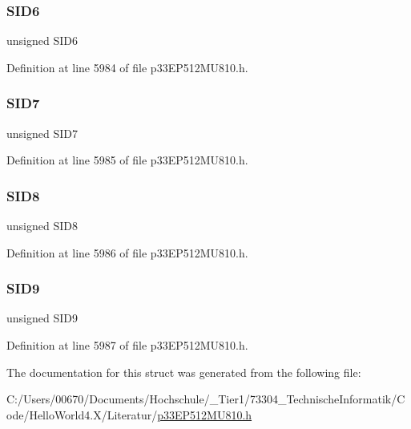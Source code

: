 \subsubsection{\texorpdfstring{S\+I\+D6}{SID6}}
{\footnotesize\ttfamily unsigned S\+I\+D6}



Definition at line 5984 of file p33\+E\+P512\+M\+U810.\+h.

\mbox{\label{structtag_c2_r_x_m1_s_i_d_b_i_t_s_a34097fb76decd431701fa2d86a22328e}} 
\subsubsection{\texorpdfstring{S\+I\+D7}{SID7}}
{\footnotesize\ttfamily unsigned S\+I\+D7}



Definition at line 5985 of file p33\+E\+P512\+M\+U810.\+h.

\mbox{\label{structtag_c2_r_x_m1_s_i_d_b_i_t_s_afe74894633244fdb0b0c01b4e8c522e7}} 
\subsubsection{\texorpdfstring{S\+I\+D8}{SID8}}
{\footnotesize\ttfamily unsigned S\+I\+D8}



Definition at line 5986 of file p33\+E\+P512\+M\+U810.\+h.

\mbox{\label{structtag_c2_r_x_m1_s_i_d_b_i_t_s_a33587704948067005c2a6a3ccc503c99}} 
\subsubsection{\texorpdfstring{S\+I\+D9}{SID9}}
{\footnotesize\ttfamily unsigned S\+I\+D9}



Definition at line 5987 of file p33\+E\+P512\+M\+U810.\+h.



The documentation for this struct was generated from the following file\+:\begin{DoxyCompactItemize}
\item 
C\+:/\+Users/00670/\+Documents/\+Hochschule/\+\_\+\+Tier1/73304\+\_\+\+Technische\+Informatik/\+Code/\+Hello\+World4.\+X/\+Literatur/\hyperlink{p33_e_p512_m_u810_8h}{p33\+E\+P512\+M\+U810.\+h}\end{DoxyCompactItemize}
